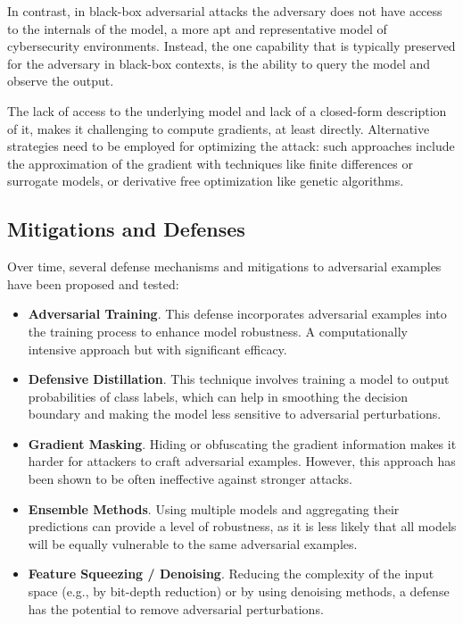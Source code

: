 In contrast, in black-box adversarial attacks the adversary does not have access to the internals of the model, a more apt and representative model of cybersecurity environments.
Instead, the one capability that is typically preserved for the adversary in black-box contexts, is the ability to query the model and observe the output.

The lack of access to the underlying model and lack of a closed-form description of it, makes it challenging to compute gradients, at least directly.
Alternative strategies need to be employed for optimizing the attack: such approaches include the approximation of the gradient with techniques like finite differences or surrogate models, or derivative free optimization like genetic algorithms.

\subsection{Mitigations and Defenses}

Over time, several defense mechanisms and mitigations to adversarial examples have been proposed and tested:

\begin{itemize}
    \item \textbf{Adversarial Training}. This defense incorporates adversarial examples into the training process to enhance model robustness. A computationally intensive approach but with significant efficacy.
    \item \textbf{Defensive Distillation}. This technique involves training a model to output probabilities of class labels, which can help in smoothing the decision boundary and making the model less sensitive to adversarial perturbations.
    \item \textbf{Gradient Masking}. Hiding or obfuscating the gradient information makes it harder for attackers to craft adversarial examples. However, this approach has been shown to be often ineffective against stronger attacks.
    \item \textbf{Ensemble Methods}. Using multiple models and aggregating their predictions can provide a level of robustness, as it is less likely that all models will be equally vulnerable to the same adversarial examples.
    \item \textbf{Feature Squeezing / Denoising}. Reducing the complexity of the input space (e.g., by bit-depth reduction) or by using denoising methods, a defense has the potential to remove adversarial perturbations.
\end{itemize}

